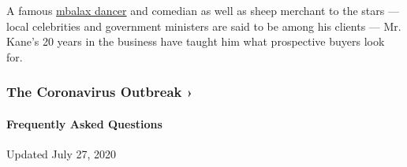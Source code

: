 A famous \href{https://www.youtube.com/watch?v=SfeOEF8zvcs}{mbalax
dancer} and comedian as well as sheep merchant to the stars --- local
celebrities and government ministers are said to be among his clients
--- Mr. Kane's 20 years in the business have taught him what prospective
buyers look for.

\href{https://www.nytimes.com/news-event/coronavirus?action=click\&pgtype=Article\&state=default\&region=MAIN_CONTENT_3\&context=storylines_faq}{}

\hypertarget{the-coronavirus-outbreak-}{%
\subsubsection{The Coronavirus Outbreak
›}\label{the-coronavirus-outbreak-}}

\hypertarget{frequently-asked-questions}{%
\paragraph{Frequently Asked
Questions}\label{frequently-asked-questions}}

Updated July 27, 2020

